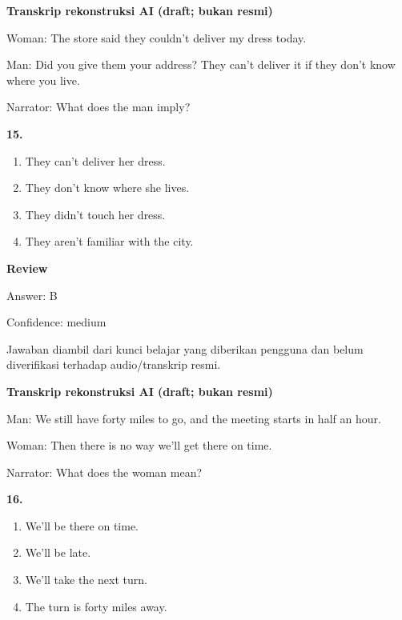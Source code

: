 \documentclass[12pt]{article}
\begin{document}
\vspace{0.25\baselineskip}
\begin{exampleblock}
\textbf{Transkrip rekonstruksi AI (draft; bukan resmi)}\par
Woman: The store said they couldn't deliver my dress today.\par
Man: Did you give them your address? They can't deliver it if they don't know where you live.\par
Narrator: What does the man imply?\par
\end{exampleblock}
\noindent\textbf{15.}
\begin{enumerate}[label=(\Alph*),leftmargin=*,itemsep=0.2em]
\item They can't deliver her dress.
\item They don't know where she lives.
\item They didn't touch her dress.
\item They aren't familiar with the city.
\end{enumerate}
\par
\begingroup
\setlength{\parskip}{0pt}
\setlength{\parindent}{0pt}
\textbf{Review}\par
Answer: B\par
Confidence: medium\par
Jawaban diambil dari kunci belajar yang diberikan pengguna dan belum diverifikasi terhadap audio/transkrip resmi.\par
\endgroup
\par
\vspace{0.25\baselineskip}
\begin{exampleblock}
\textbf{Transkrip rekonstruksi AI (draft; bukan resmi)}\par
Man: We still have forty miles to go, and the meeting starts in half an hour.\par
Woman: Then there is no way we'll get there on time.\par
Narrator: What does the woman mean?\par
\end{exampleblock}
\noindent\textbf{16.}
\begin{enumerate}[label=(\Alph*),leftmargin=*,itemsep=0.2em]
\item We'll be there on time.
\item We'll be late.
\item We'll take the next turn.
\item The turn is forty miles away.
\end{enumerate}
\end{document}
